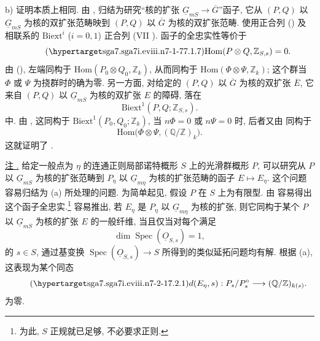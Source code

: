 \smallskip
\noindent b) 证明本质上相同. 由 , 归结为研究“核的扩张 $\underline G_{mS}\to\overline G$”函子, 它从 $(P,Q)$ 以 $\underline G_{mS}$ 为核的双扩张范畴映到 $(P,Q)$ 以 $\overline G$ 为核的双扩张范畴. 使用正合列 () 及相联系的 $\mathrm{Biext}^i$ ($i=0,1$) 正合列 (VII ). 函子的全忠实性等价于
\begin{equation}\tag{\SGARefTarget{sga7.sga7i.eviii.n7-1-7}{7.1.7}}
 \mathrm{Hom}(P\otimes Q,\mathbb Z_{S,s})=0.
\end{equation}
由 (), 左端同构于 $\mathrm{Hom}(P_0\otimes Q_0,\mathbb Z_k)$, 从而同构于 $\mathrm{Hom}(\Phi\otimes\Psi,\mathbb Z_k)$; 这个群当 $\Phi$ 或 $\Psi$ 为挠群时的确为零. 另一方面, 对给定的 $(P,Q)$ 以 $\overline G$ 为核的双扩张 $\overline E$, 它来自 $(P,Q)$ 以 $\underline G_{mS}$ 为核的双扩张 $E$ 的障碍, 落在
\[
 \mathrm{Biext}^1(P,Q;\mathbb Z_{S,s}).
\]
中. 由 , 这同构于 $\mathrm{Biext}^1(P_0,Q_0;\mathbb Z_k)$, 当 $n\Phi=0$ 或 $n\Psi=0$ 时, 后者又由  同构于
\[
 \mathrm{Hom}\bigl(\Phi\otimes\Psi,(\mathbb Q/\mathbb Z)_k\bigr).
\]
这就证明了 .




\medskip
\noindent\underline{注 .} 给定一般点为 $\eta$ 的连通正则局部诺特概形 $S$ 上的光滑群概形 $P$, 可以研究从 $P$ 以 $\underline G_{mS}$ 为核的扩张范畴到 $P_\eta$ 以 $\underline G_{m\eta}$ 为核的扩张范畴的函子 $E\mapsto E_\eta$. 这个问题容易归结为 (a) 所处理的问题. 为简单起见, 假设 $P$ 在 $S$ 上为有限型. 由  容易得出这个函子全忠实.\footnote{为此, $S$ 正规就已足够, 不必要求正则.} 容易推出, 若 $E_\eta$ 是 $P_\eta$ 以 $\underline G_{m\eta}$ 为核的扩张, 则它同构于某个 $P$ 以 $\underline G_{mS}$ 为核的扩张 $E$ 的一般纤维, 当且仅当对每个满足
\[
 \dim\operatorname{Spec}(\underline O_{S,s})=1,
\]
的 $s\in S$, 通过基变换 $\operatorname{Spec}(\underline O_{S,s})\to S$ 所得到的类似延拓问题均有解. 根据 (a), 这表现为某个同态
\begin{equation}\tag{\SGARefTarget{sga7.sga7i.eviii.n7-2-1}{7.2.1}}
 d(E_\eta,s):P_s/P_s^{\circ}
 \longrightarrow(\mathbb Q/\mathbb Z)_{k(s)}.
\end{equation}
为零.

